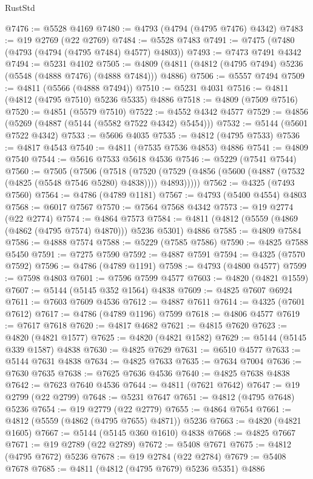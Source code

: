 \begin{lexlean}{RustStd}
\begin{coremodule}
@7476 := @5528 @4169
@7480 := @4793 (@4794 (@4795 @7476) @4342)
@7483 := @19 @2769 (@22 @2769)
@7484 := @5528 @7483
@7491 := @7475 (@7480 (@4793 (@4794 (@4795 @7484) @4577) @4803))
@7493 := @7473 @7491 @4342
@7494 := @5231 @4102
@7505 := @4809 (@4811 (@4812 (@4795 @7494) @5236 (@5548 (@4888 @7476) (@4888 @7484))) @4886)
@7506 := @5557 @7494
@7509 := @4811 (@5566 (@4888 @7494))
@7510 := @5231 @4031
@7516 := @4811 (@4812 (@4795 @7510) @5236 @5335) @4886
@7518 := @4809 (@7509 @7516)
@7520 := @4851 (@5579 @7510)
@7522 := @4552 @4342 @4577
@7529 := @4856 (@5269 (@4887 (@5144 (@5582 @7522 @4342) @5454)))
@7532 := @5144 (@5601 @7522 @4342)
@7533 := @5606 @4035
@7535 := @4812 (@4795 @7533)
@7536 := @4817 @4543
@7540 := @4811 (@7535 @7536 @4853) @4886
@7541 := @4809 @7540
@7544 := @5616 @7533 @5618 @4536
@7546 := @5229 (@7541 @7544)
@7560 := @7505
    (@7506
      (@7518
        (@7520 (@7529 (@4856 (@5600 (@4887 (@7532 (@4825 (@5548 @7546 @5280) @4838)))) @4893)))))
@7562 := @4325 (@7493 @7560)
@7564 := @4786 (@4789 @1181)
@7567 := @4793 (@5400 @4554) @4803
@7568 := @6017 @7567
@7570 := @7564 @7568 @4342
@7573 := @19 @2774 (@22 @2774)
@7574 := @4864 @7573
@7584 := @4811 (@4812 (@5559 (@4869 (@4862 (@4795 @7574) @4870))) @5236 @5301) @4886
@7585 := @4809 @7584
@7586 := @4888 @7574
@7588 := @5229 (@7585 @7586)
@7590 := @4825 @7588 @5450
@7591 := @7275 @7590
@7592 := @4887 @7591
@7594 := @4325 (@7570 @7592)
@7596 := @4786 (@4789 @1191)
@7598 := @4793 (@4800 @4577)
@7599 := @7598 @4803
@7601 := @7596 @7599 @4577
@7603 := @4820 (@4821 @1559)
@7607 := @5144 (@5145 @352 @1564) @4838
@7609 := @4825 @7607 @6924
@7611 := @7603 @7609 @4536
@7612 := @4887 @7611
@7614 := @4325 (@7601 @7612)
@7617 := @4786 (@4789 @1196) @7599
@7618 := @4806 @4577
@7619 := @7617 @7618
@7620 := @4817 @4682
@7621 := @4815 @7620
@7623 := @4820 (@4821 @1577)
@7625 := @4820 (@4821 @1582)
@7629 := @5144 (@5145 @339 @1587) @4838
@7630 := @4825 @7629
@7631 := @6510 @4577
@7633 := @5144 @7631 @4838
@7634 := @4825 @7633
@7635 := @7634 @7004
@7636 := @7630 @7635
@7638 := @7625 @7636 @4536
@7640 := @4825 @7638 @4838
@7642 := @7623 @7640 @4536
@7644 := @4811 (@7621 @7642)
@7647 := @19 @2799 (@22 @2799)
@7648 := @5231 @7647
@7651 := @4812 (@4795 @7648) @5236
@7654 := @19 @2779 (@22 @2779)
@7655 := @4864 @7654
@7661 := @4812 (@5559 (@4862 (@4795 @7655) @4871)) @5236
@7663 := @4820 (@4821 @1605)
@7667 := @5144 (@5145 @360 @1610) @4838
@7668 := @4825 @7667
@7671 := @19 @2789 (@22 @2789)
@7672 := @5408 @7671
@7675 := @4812 (@4795 @7672) @5236
@7678 := @19 @2784 (@22 @2784)
@7679 := @5408 @7678
@7685 := @4811 (@4812 (@4795 @7679) @5236 @5351) @4886

\end{coremodule}
\end{lexlean}
